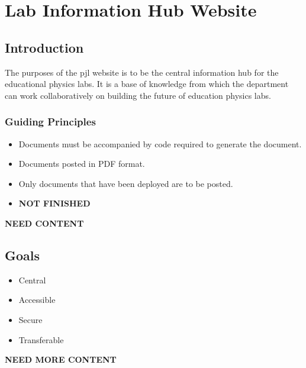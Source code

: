 \documentclass[justified]{LabArx1_5}
\begin{document}




\maketitle
\newpage
\tableofcontents
\newpage

\section{Lab Information Hub Website}

\subsection{Introduction}

The purposes of the pjl website is to be the central information hub for the educational physics labs. It is a base of knowledge from which the department can work collaboratively on building the future of education physics labs.

\subsubsection{Guiding Principles}

\begin{itemize}
\item Documents must be accompanied by code required to generate the document.
\item Documents posted in PDF format.
\item Only documents that have been deployed are to be posted. 
\item {\bf NOT FINISHED}
\end{itemize}

{\bf NEED CONTENT}

\subsection{Goals}

\begin{itemize}
\item Central
\item Accessible
\item Secure
\item Transferable
\end{itemize}
{\bf NEED MORE CONTENT}
\end{document}
